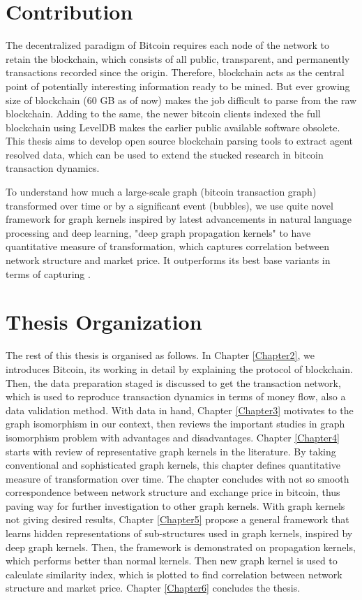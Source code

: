 \section{Contribution}
\label{sec:contribution}

The decentralized paradigm of Bitcoin requires each node of the network
to retain the blockchain, which consists of all public, transparent, and permanently transactions recorded since the origin. Therefore, blockchain acts as the central point of potentially interesting information ready to be mined. But ever growing size of blockchain (60 GB as of now) makes the job difficult to parse from the raw blockchain. Adding to the same, the newer bitcoin clients indexed the full blockchain using LevelDB makes the earlier public available software obsolete. This thesis aims to develop open source blockchain parsing tools to extract agent resolved data, which can be used to extend the stucked research in bitcoin transaction dynamics. 

To understand how much a large-scale graph (bitcoin transaction graph) transformed over time or by a significant event (bubbles), we use quite novel framework for graph kernels inspired by latest advancements in natural language processing and deep learning, "deep graph propagation kernels" to have quantitative measure of transformation, which captures correlation between network structure and market price. It outperforms its best base variants in terms of capturing .
 

 
\section{Thesis Organization}

The rest of this thesis is organised as follows. In Chapter \ref{Chapter2}, 
we introduces Bitcoin, its working in detail by explaining the protocol of blockchain. Then, the data preparation staged is discussed to get the transaction network, which is used to reproduce transaction dynamics in terms of money flow, also a data validation method.  With data in hand, Chapter \ref{Chapter3} motivates to the graph isomorphism in our context, then reviews the important studies in graph isomorphism problem with advantages and disadvantages. Chapter \ref{Chapter4} starts with review of representative graph kernels in the literature. By taking conventional and sophisticated graph kernels, this chapter defines quantitative measure of transformation over time. The chapter concludes with not so smooth correspondence between network structure and exchange price in bitcoin, thus paving way for further investigation to other graph kernels. With graph kernels not giving desired results, Chapter \ref{Chapter5} propose a general framework that learns hidden representations of sub-structures used in graph kernels, inspired
by deep graph kernels. Then, the framework  is demonstrated on propagation kernels, which performs better than normal kernels. Then new graph kernel is used to calculate similarity index, which is plotted to find correlation between network structure and market price. Chapter \ref{Chapter6} concludes the thesis.



